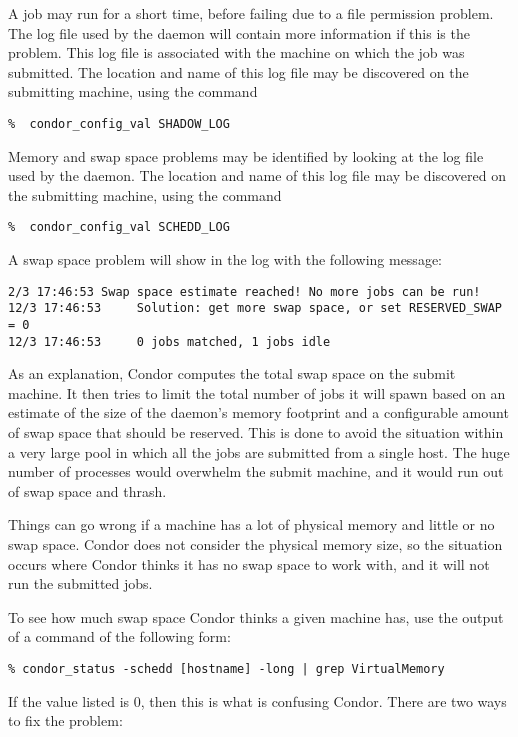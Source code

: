A job may run for a short time, before failing due to a file permission
problem.
The log file used by the  daemon will contain more information
if this is the problem.
This log file is associated with the machine on which the job was submitted.
The location and name of this log file may be discovered on the
submitting machine, using the command
\footnotesize
\begin{verbatim}
%  condor_config_val SHADOW_LOG
\end{verbatim}
\normalsize

Memory and swap space problems may be identified by looking at the log
file used by the  daemon.
The location and name of this log file may be discovered on the
submitting machine, using the command
\footnotesize
\begin{verbatim}
%  condor_config_val SCHEDD_LOG
\end{verbatim}
\normalsize
A swap space problem will show in the log with the following message:
\footnotesize
\begin{verbatim}
2/3 17:46:53 Swap space estimate reached! No more jobs can be run!
12/3 17:46:53     Solution: get more swap space, or set RESERVED_SWAP = 0
12/3 17:46:53     0 jobs matched, 1 jobs idle
\end{verbatim}
\normalsize
As an explanation,
Condor computes the total swap space on the submit machine.
It then tries to limit the total number of jobs it
will spawn based on an estimate of the size of the 
daemon's memory footprint and a configurable amount of swap space
that should be reserved.
This is done to avoid the
situation within a very large pool
in which all the jobs are submitted from a single host.
The huge number of  processes would
overwhelm the submit machine,
and it would run out of swap space and thrash.

Things can go wrong if a machine has a lot of physical memory and
little or no swap space.
Condor does not consider the physical memory size,
so the situation occurs where Condor thinks
it has no swap space to work with,
and it will not run the submitted jobs.

To see how much swap space Condor thinks a given machine has, use
the output of a  command of the following form:

\footnotesize
\begin{verbatim}
% condor_status -schedd [hostname] -long | grep VirtualMemory
\end{verbatim}
\normalsize
If the value listed is 0, then this is what is confusing Condor.
There are two ways to fix the problem:

